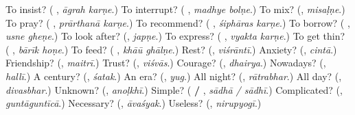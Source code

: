 \begin{tcolorbox}[breakable,colback=teal!4,colframe=teal!35!black,title={Before you move on}]
To insist? (\textbf{ }, \emph{āgrah karṇe}.) To interrupt? (\textbf{ }, \emph{madhye bolṇe}.) To mix? (\textbf{}, \emph{misaḷṇe}.) To pray? (\textbf{ }, \emph{prārthanā karṇe}.) To recommend? (\textbf{ }, \emph{śiphāras karṇe}.) To borrow? (\textbf{ }, \emph{usne gheṇe}.) To look after? (\textbf{}, \emph{japṇe}.) To express? (\textbf{ }, \emph{vyakta karṇe}.) To get thin? (\textbf{ }, \emph{bārīk hoṇe}.) To feed? (\textbf{ }, \emph{khāū ghālṇe}.) Rest? (\textbf{}, \emph{viśrāntī}.) Anxiety? (\textbf{}, \emph{cintā}.) Friendship? (\textbf{}, \emph{maitrī}.) Trust? (\textbf{}, \emph{viśvās}.) Courage? (\textbf{}, \emph{dhairya}.) Nowadays? (\textbf{}, \emph{hallī}.) A century? (\textbf{}, \emph{śatak}.) An era? (\textbf{}, \emph{yug}.) All night? (\textbf{}, \emph{rātrabhar}.) All day? (\textbf{}, \emph{divasbhar}.) Unknown? (\textbf{}, \emph{anoḷkhī}.) Simple? (\textbf{ / }, \emph{sādhā / sādhī}.) Complicated? (\textbf{}, \emph{guntāguntīcā}.) Necessary? (\textbf{}, \emph{āvaśyak}.) Useless? (\textbf{}, \emph{nirupyogī}.)
\end{tcolorbox}

